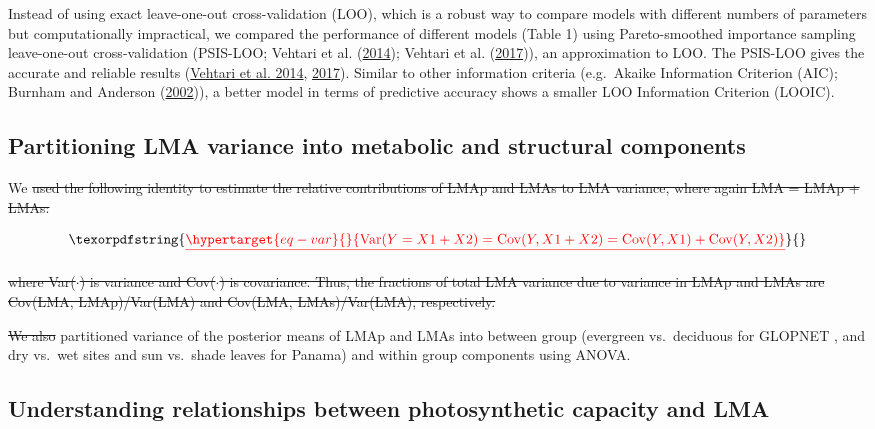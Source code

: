 \documentclass[
  12pt,
  a4paper,
,tablecaptionabove
]{scrartcl}
\providecommand{\DIFaddtex}[1]{{\protect\color{blue}\uwave{#1}}} %
\providecommand{\DIFdeltex}[1]{{\protect\color{red}\sout{#1}}}                      %
\providecommand{\DIFaddbegin}{} %
\providecommand{\DIFaddend}{} %
\providecommand{\DIFdelbegin}{} %
\providecommand{\DIFdelend}{} %
\providecommand{\DIFadd}[1]{\texorpdfstring{\DIFaddtex{#1}}{#1}} %
\providecommand{\DIFdel}[1]{\texorpdfstring{\DIFdeltex{#1}}{}} %
\newcommand{\DIFscaledelfig}{0.5}
\newlength{\DIFdelgraphicswidth} %
\newlength{\DIFdelgraphicsheight} %
\newcommand{\DIFaddincludegraphics}[2][]{{\color{blue}\fbox{\DIFOincludegraphics[#1]{#2}}}} %
\newcommand{\DIFdelincludegraphics}[2][]{%
\sbox{\DIFdelgraphicsbox}{\DIFOincludegraphics[#1]{#2}}%
\settoboxwidth{\DIFdelgraphicswidth}{\DIFdelgraphicsbox} %
\settoboxtotalheight{\DIFdelgraphicsheight}{\DIFdelgraphicsbox} %
\scalebox{\DIFscaledelfig}{%
\parbox[b]{\DIFdelgraphicswidth}{\usebox{\DIFdelgraphicsbox}\\[-\baselineskip] \rule{\DIFdelgraphicswidth}{0em}}\llap{\resizebox{\DIFdelgraphicswidth}{\DIFdelgraphicsheight}{%
\setlength{\unitlength}{\DIFdelgraphicswidth}%
\begin{picture}(1,1)%
\thicklines\linethickness{2pt} %
{\color[rgb]{1,0,0}\put(0,0){\framebox(1,1){}}}%
{\color[rgb]{1,0,0}\put(0,0){\line( 1,1){1}}}%
{\color[rgb]{1,0,0}\put(0,1){\line(1,-1){1}}}%
\end{picture}%
}\hspace*{3pt}}} %
} %
\DeclareRobustCommand{\DIFaddbegin}{\DIFOaddbegin \let\includegraphics\DIFaddincludegraphics} %
\DeclareRobustCommand{\DIFaddend}{\DIFOaddend \let\includegraphics\DIFOincludegraphics} %
\DeclareRobustCommand{\DIFdelbegin}{\DIFOdelbegin \let\includegraphics\DIFdelincludegraphics} %
\DeclareRobustCommand{\DIFdelend}{\DIFOaddend \let\includegraphics\DIFOincludegraphics} %
\begin{document}
Instead of using exact leave-one-out cross-validation (LOO), which is a
robust way to compare models with different numbers of parameters but
computationally impractical, we compared the performance of different
models (Table 1) using Pareto-smoothed importance sampling leave-one-out
cross-validation (PSIS-LOO; Vehtari et al.
(\protect\hyperlink{ref-Vehtari2014}{2014}); Vehtari et al.
(\protect\hyperlink{ref-Vehtari2017}{2017})), an approximation to LOO.
The PSIS-LOO gives the accurate and reliable results
(\protect\hyperlink{ref-Vehtari2014}{Vehtari et al. 2014},
\protect\hyperlink{ref-Vehtari2017}{2017}). Similar to other information
criteria (e.g.~Akaike Information Criterion (AIC); Burnham and Anderson
(\protect\hyperlink{ref-Burnham2002}{2002})), a better model in terms of
predictive accuracy shows a smaller LOO Information Criterion (LOOIC).

\hypertarget{partitioning-lma-variance-into-metabolic-and-structural-components}{%
\subsection{Partitioning LMA variance into metabolic and structural
components}\label{partitioning-lma-variance-into-metabolic-and-structural-components}}

We \DIFdelbegin \DIFdel{used the following identity to estimate the relative contributions of
LMAp and LMAs to LMA variance, where again LMA = LMAp + LMAs:
}%

\begin{displaymath}\DIFdel{\protect\hypertarget{eq-var}{}{
\mathrm{Var}(Y = X1 + X2) = \mathrm{Cov}(Y, X1+X2) = \mathrm{Cov}(Y,X1) + \mathrm{Cov}(Y,X2)
}%
}\end{displaymath}%

\DIFdel{where Var(\(\cdot\)) is variance and Cov(\(\cdot\)) is covariance. Thus,
the fractions of total LMA variance due to variance in LMAp and LMAs are
Cov(LMA, LMAp)/Var(LMA) and Cov(LMA, LMAs)/Var(LMA), respectively.
}%

\DIFdel{We also }\DIFdelend partitioned variance of the posterior means of LMAp and LMAs into
between group (evergreen vs.~deciduous for GLOPNET \DIFaddbegin \DIFadd{and Panama}\DIFaddend , and dry
vs.~wet sites and sun vs.~shade leaves for Panama) and within group
components using ANOVA.

\hypertarget{understanding-relationships-between-photosynthetic-capacity-and-lma}{%
\subsection{Understanding relationships between photosynthetic capacity
and
LMA}\label{understanding-relationships-between-photosynthetic-capacity-and-lma}}
\end{document}
